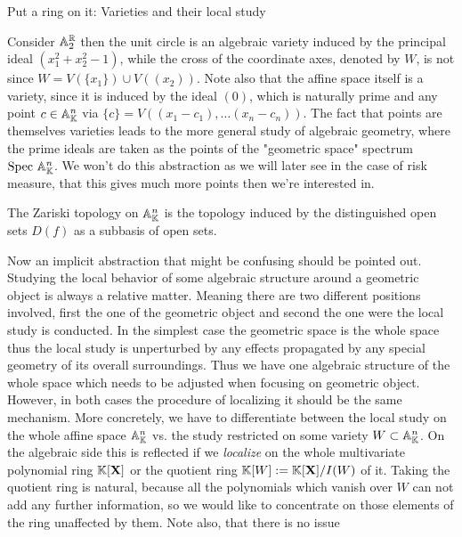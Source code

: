 \begin{subsection}{Put a ring on it: Varieties and their local study}
    \begin{example}
        Consider \( \mathbb{A}^{\mathbb{R}}_{2} \) then the unit circle is an algebraic variety induced by the principal ideal \( (x_1^2 + x_2^2 - 1) \),
        while the cross of the coordinate axes, denoted by \( W \), is not since \( W = V(\{x_1\}) \cup V((x_2)) \). Note also that the affine space
        itself is a variety, since it is induced by the ideal \( (0) \), which is naturally prime and any point \( c \in \mathbb{A}^{n}_{\mathbb{K}} \) via 
        \( \{c\} = V((x_1 - c_1), \dots (x_n - c_n)) \). The fact that points are themselves varieties leads to the more general study
        of algebraic geometry, where the prime ideals are taken as the points of the "geometric space" spectrum \( \text{Spec } \mathbb{A}^{n}_{\mathbb{K}} \).
        We won't do this abstraction as we will later see in the case of risk measure, that this gives much more points then we're interested in.
    \end{example}
    \begin{definition}
        The Zariski topology on \( \mathbb{A}^{n}_{\mathbb{K}} \) is the topology induced by the distinguished open sets \( D(f) \)
        as a subbasis of open sets.
    \end{definition}
    \newline
    Now an implicit abstraction that might be confusing should be pointed out. Studying the local behavior
    of some algebraic structure around a geometric object is always a relative matter. Meaning
    there are two different positions involved, first the one of the geometric object and second the one were the local study
    is conducted. In the simplest case the geometric space is the whole space thus the local study is unperturbed by any effects 
    propagated by any special geometry of its overall surroundings. Thus we have one algebraic structure of the whole space which needs 
    to be adjusted when focusing on geometric object. However, in both cases the procedure of localizing it should be the same mechanism.
    More concretely, we have to differentiate between the local study on the whole affine space \( \mathbb{A}^{n}_{\mathbb{K}} \)
    vs. the study restricted on some variety \( W \subset \mathbb{A}^{n}_{\mathbb{K}} \). On the algebraic 
    side this is reflected if we \textit{localize} on the whole multivariate polynomial ring \( \mathbb{K}[\mathbf{X}] \) or the quotient ring
    \( \mathbb{K}[W] := \mathbb{K}[\mathbf{X}] / I(W) \) of it. Taking the quotient ring is natural, because all the polynomials which vanish over \( W \) can not add  
    any further information, so we would like to concentrate on those elements of the ring unaffected by them. Note also, that there is no issue

\end{subsection}

